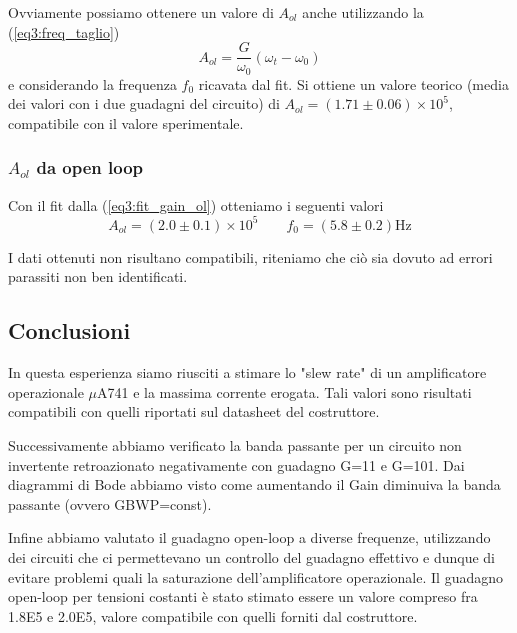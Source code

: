 Ovviamente possiamo ottenere un valore di $A_{ol}$ anche utilizzando la (\ref{eq3:freq_taglio})
$$A_{ol} = \frac{G}{\omega_0} (\omega_t - \omega_0)$$
e considerando la frequenza $f_0$ ricavata dal fit. Si ottiene un valore teorico (media dei valori con i due guadagni del circuito) di $A_{ol} = (1.71\pm 0.06)\times 10^5$, compatibile con il valore sperimentale.

\subsubsection{$A_{ol}$ da open loop}

Con il fit dalla (\ref{eq3:fit_gain_ol}) otteniamo i seguenti valori
$$A_{ol}=(2.0\pm0.1)\times 10^5 \qquad f_0=(5.8\pm0.2)\si{\hertz}$$

I dati ottenuti non risultano compatibili, riteniamo che ciò sia dovuto ad errori parassiti non ben identificati.

\subsection*{Conclusioni}

In questa esperienza siamo riusciti a stimare lo "slew rate" di un amplificatore operazionale $\mu$A741 e la massima corrente erogata. Tali valori sono risultati compatibili con quelli riportati sul datasheet del costruttore. 

Successivamente abbiamo verificato la banda passante per un circuito non invertente retroazionato negativamente con guadagno G=11 e G=101. Dai diagrammi di Bode abbiamo visto come aumentando il Gain diminuiva la banda passante (ovvero GBWP=const).

Infine abbiamo valutato il guadagno open-loop a diverse frequenze, utilizzando dei circuiti che ci permettevano un controllo del guadagno effettivo e dunque di evitare problemi quali la saturazione dell'amplificatore operazionale. Il guadagno open-loop per tensioni costanti è stato stimato essere un valore compreso fra \num{1.8E5} e \num{2.0E5}, valore compatibile con quelli forniti dal costruttore.
